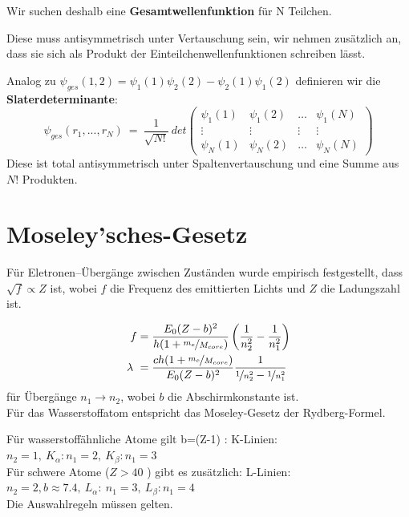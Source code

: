 \documentclass[Ex4_Zusammenfassung.tex]{subfiles}
\begin{document}
Wir suchen deshalb eine  \textbf{Gesamtwellenfunktion} für N Teilchen.

Diese muss antisymmetrisch unter Vertauschung sein, wir nehmen zusätzlich an, dass sie sich als Produkt der Einteilchenwellenfunktionen schreiben lässt.

Analog zu $ \psi_{ges}(1,2) = \psi_1(1) \psi_2(2) - \psi_2(1) \psi_1(2) $  definieren wir die \\ \textbf{Slaterdeterminante}: 
	\begin{equation}
	  \psi_{ges}(r_1,...,r_N) \ = \  \frac{1}{\sqrt{N!}} \  det \begin{pmatrix} \psi_1(1) & \psi_1(2) & \dots & \psi_1(N) \\ \vdots & \vdots & \vdots & \vdots \\  \psi_N(1) & \psi_N(2) & \dots & \psi_N(N)  \end{pmatrix} 
	\end{equation}
Diese ist total antisymmetrisch unter Spaltenvertauschung und eine Summe aus $N!$ Produkten. 
\section{Moseley'sches-Gesetz}
Für Eletronen--Übergänge zwischen Zuständen wurde empirisch festgestellt, dass $ \sqrt{f} \propto Z $ ist, wobei $f$ die Frequenz des emittierten Lichts und $Z$ die Ladungszahl  ist. 

\begin{align}
	f &= \frac{E_0 (Z-b)^2}{h (1+\nicefrac{m_e}{M_{core}})} \left(\frac{1}{n_2^2} - \frac{1}{n_1^2}\right) \\ 
	\lambda \ & = \frac{ch(1+\nicefrac{m_e}{M_{core}})}{E_0 (Z-b)^2} \frac{1}{\nicefrac{1}{n_2^2} - \nicefrac{1}{n_1^2}} 
\end{align}
für Übergänge $ n_1 \rightarrow n_2 $, wobei $b$ die Abschirmkonstante ist.\\

Für das Wasserstoffatom entspricht das Moseley-Gesetz der Rydberg-Formel.

Für wasserstoffähnliche Atome gilt b=(Z-1) : \newline \quad K-Linien: $ n_2 = 1, \  K_{\alpha} :  n_1 = 2, \  K_{\beta}: n_1 = 3 $ \\ \newline
Für schwere Atome ($ Z > 40 $  )  gibt es zusätzlich: \newline \qquad L-Linien: $ n_2 = 2 , b \approx 7.4 , \ L_{\alpha} : \ n_1= 3 , \  L_{\beta}: n_1 = 4 $\\

Die Auswahlregeln müssen gelten.
\end{document}
